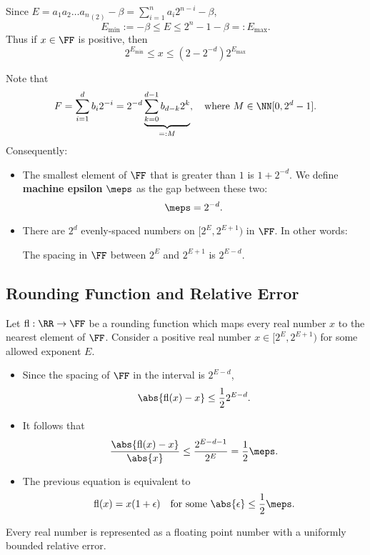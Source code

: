 \documentclass[]{ximera}
\begin{document}
Since $E = a_1 a_2 \ldots {a_n}_{(2)} - \beta = \sum_{i=1}^n a_i 2^{n-i} - \beta$,
\[
E_{\text{min}} := -\beta \le E \le 2^n - 1 - \beta =: E_{\text{max}}.
\]
Thus if $x \in \FF$ is positive, then
\[
2^{E_\text{min}} \le x \le (2-2^{-d})2^{E_\text{max}}
\]

Note that
\[
F = \sum_{i=1}^{d} b_i 2^{-i} = 2^{-d} \underbrace{\sum_{k=0}^{d-1} b_{d-k} 2^k}_{=:M},
\quad \text{where } M \in \NN[0, 2^d - 1].
\]
Consequently:

\begin{itemize}
\item The smallest element of $\FF$ that is greater than $1$ is $1 + 2^{-d}$. We define \textbf{machine epsilon} $\meps$ as the gap between these two:
\[
   \meps = 2^{-d}.
   \]
\item There are $2^d$ evenly-spaced numbers on $[2^E, 2^{E+1})$ in $\FF$. In other words:
\vs
\begin{center}
\begin{tcolorbox}[width=0.8\linewidth,arc=0mm,boxrule=0.7pt,colback=white,nobeforeafter]
The spacing in $\FF$ between $2^E$ and $2^{E+1}$ is $2^{E-d}$.
\end{tcolorbox}
\end{center}
\end{itemize}

\subsection{Rounding Function and Relative Error}
\label{sec:org2fe8153}
Let $\text{fl}:\RR \to \FF$ be a rounding function which maps every real number $x$ to the nearest element of $\FF$. Consider a positive real number $x \in [2^E, 2^{E+1})$ for some allowed exponent $E$.
\begin{itemize}
\item Since the spacing of $\FF$ in the interval is $2^{E-d}$,
\[
   \abs{ \text{fl}(x) - x } \le \frac{1}{2} 2^{E - d}.
   \]
\item It follows that
\[
   \frac{ \abs{\text{fl}(x) - x} }{ \abs{x} } \le \frac{2^{E-d-1}}{2^E} = \frac{1}{2} \meps.
   \]
\item The previous equation is equivalent to
\[
   \text{fl}(x) = x(1+\epsilon) \quad\text{for some } \abs{\epsilon} \le \frac{1}{2} \meps.
   \]
\end{itemize}

\begin{center}
\begin{tcolorbox}[width=0.8\linewidth,arc=0mm,boxrule=0.7pt,colback=white,nobeforeafter]
Every real number is represented as a floating point number with a uniformly bounded relative error.
\end{tcolorbox}
\end{center}
\end{document}
